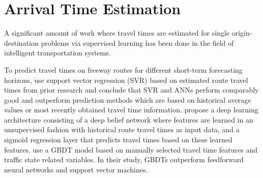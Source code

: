 \section{Arrival Time Estimation}




\cite{Masiero2011_SVR}

\cite{Chen2004_ANNKalman} 


A significant amount of work where travel times are estimated for single origin-destination problems via supervised learning has been done in the field of intelligent transportation systems.

To predict travel times on freeway routes for different short-term forecasting horizons, \cite{Vanajakshi2007} use support vector regression (SVR) based on estimated route travel times from prior research and conclude that SVR and ANNs perform comparably good and outperform prediction methods which are based on historical average values or most recently obtained travel time information. 
\cite{Siripanpornchana2016_AnnWithDbnFS} propose a deep learning architecture consisting of a deep belief network where features are learned in an unsupervised fashion with historical route travel times as input data, and a sigmoid regression layer that predicts travel times based on these learned features. \cite{Cheng2019_GBDT} use a GBDT model based on manually selected travel time features and traffic state related variables. In their study, GBDTs outperform feedforward neural networks and support vector machines.

